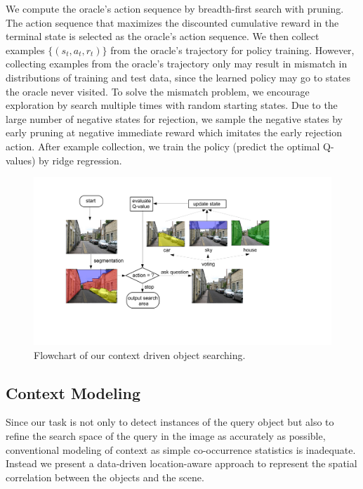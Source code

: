We compute the oracle's action sequence by breadth-first
search with pruning. The action sequence that maximizes the discounted
cumulative reward in the terminal state is selected as the oracle's action
sequence.
We then collect examples $\{(s_t,a_t,r_t)\}$ from the oracle's trajectory for
policy training.
However, collecting examples from the oracle's trajectory
only may result in mismatch in distributions of training and test data, since
the learned policy may go to states the oracle never visited.
To solve the mismatch problem, we encourage exploration by search multiple
times with random starting states.  Due to the large number of negative states for rejection, we sample the negative states by early pruning at negative immediate reward which imitates the early rejection action. After example collection, we train the policy (predict the optimal Q-values) by
ridge regression.

\begin{figure}[htb]
\begin{center}
\includegraphics[width=0.8\linewidth]{figures/flowchart_Q.pdf}
\caption{Flowchart of our context driven object searching. %
}
\label{fig:flowchart}
\end{center}\vspace{-1.6em}
\end{figure}

\subsection{Context Modeling}
\label{sec:context}
Since our task is not only to detect instances of the query object but also to refine the search space of the query in the image as accurately as possible, conventional modeling of context as simple co-occurrence statistics is inadequate. Instead we present a data-driven location-aware approach to represent the spatial correlation between the objects and the scene. 

